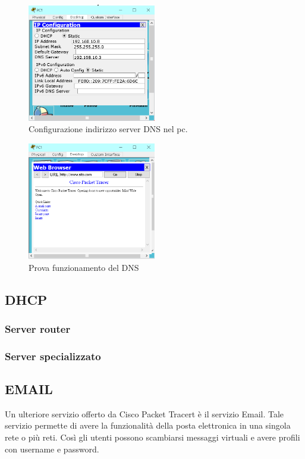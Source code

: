 \begin{figure}[htbp]
    \centering
    \includegraphics[width=0.5\textwidth]{images/06.servizi-rete/dns/02.conf-pc.png}
    \caption{Configurazione indirizzo server DNS nel pc.}
    \label{fig:dns-conf-pc}
\end{figure}

\begin{figure}[htbp]
    \centering
    \includegraphics[width=0.5\textwidth]{images/06.servizi-rete/dns/03.test.png}
    \caption{Prova funzionamento del DNS}
    \label{fig:dns-test}
\end{figure}

\subsection{DHCP}
\subsubsection{Server router}
\subsubsection{Server specializzato}
\subsection{EMAIL}
Un ulteriore servizio offerto da Cisco Packet Tracert è il servizio Email. Tale servizio permette di avere la funzionalità della posta elettronica in una singola rete o più reti. Così gli utenti possono scambiarsi messaggi virtuali e avere profili con username e password.

